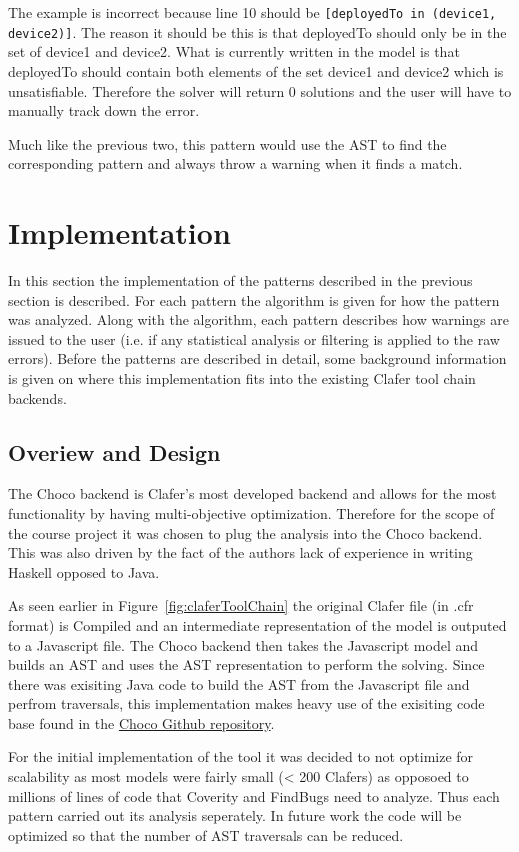 \documentclass[10pt,oneside]{IEEEtran}
\begin{document}
The example is incorrect because line 10 should be \lstinline$[deployedTo in (device1, device2)]$. The reason it should be this is that deployedTo should only be in the set of device1 and device2. What is currently written in the model is that deployedTo should contain both elements of the set device1 and device2 which is unsatisfiable. Therefore the solver will return 0 solutions and the user will have to manually track down the error.

Much like the previous two, this pattern would use the AST to find the corresponding pattern and always throw a warning when it finds a match.

\section{Implementation}
\label{sec:implementation}
In this section the implementation of the patterns described in the previous section is described. For each pattern the algorithm is given for how the pattern was analyzed. Along with the algorithm, each pattern describes how warnings are issued to the user (i.e. if any statistical analysis or filtering is applied to the raw errors). Before the patterns are described in detail, some background information is given on where this implementation fits into the existing Clafer tool chain backends.

\subsection{Overiew and Design}
The Choco backend is Clafer's most developed backend and allows for the most functionality by having multi-objective optimization. Therefore for the scope of the course project it was chosen to plug the analysis into the Choco backend. This was also driven by the fact of the authors lack of experience in writing Haskell opposed to Java.

As seen earlier in Figure~\ref{fig:claferToolChain} the original Clafer file (in .cfr format) is Compiled and an intermediate representation of the model is outputed to a Javascript file. The Choco backend then takes the Javascript model and builds an AST and uses the AST representation to perform the solving. Since there was exisiting Java code to build the AST from the Javascript file and perfrom traversals, this implementation makes heavy use of the exisiting code base found in the \href{https://github.com/gsdlab/chocosolver/}{Choco Github repository}.

For the initial implementation of the tool it was decided to not optimize for scalability as most models were fairly small (< 200 Clafers) as opposoed to millions of lines of code that Coverity and FindBugs need to analyze. Thus each pattern carried out its analysis seperately. In future work the code will be optimized so that the number of AST traversals can be reduced.
\end{document}
